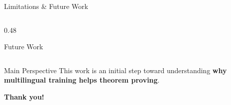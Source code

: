 \documentclass[aspectratio=169]{beamer}
\begin{document}
\begin{frame}{Limitations \& Future Work}
\begin{columns}[T,onlytextwidth]
\begin{column}{0.48\textwidth}
\begin{block}{Future Work}
\end{block}

\end{column}

\end{columns}

\vspace{0.45cm}

\begin{alertblock}{Main Perspective}
\centering
\large This work is an initial step toward understanding \textbf{why multilingual training helps theorem proving}.
\end{alertblock}

\vfill



\end{frame}


\begin{frame}[plain]
\centering
\vfill
{\Huge \textbf{Thank you!}}
\vfill
\end{frame}
\end{document}
